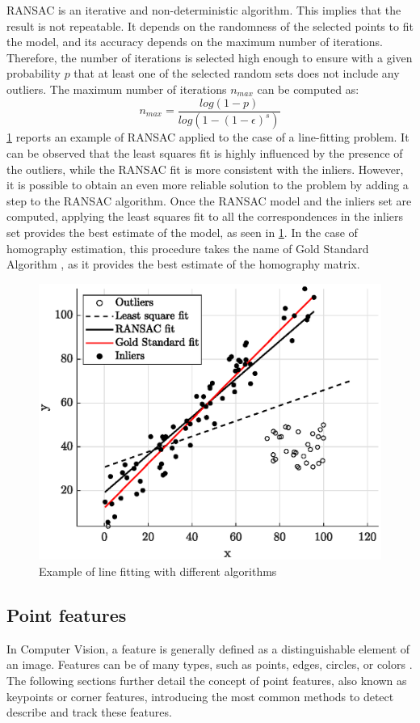 RANSAC is an iterative and non-deterministic algorithm. This implies that the result is not repeatable. It depends on the randomness of the selected points to fit the model, and its accuracy depends on the maximum number of iterations. Therefore, the number of iterations is selected high enough to ensure with a given probability $p$ that at least one of the selected random sets does not include any outliers. The maximum number of iterations $n_{max}$ can be computed as:
\begin{equation}
    n_{max} = \frac{log(1-p)}{log(1-(1-\epsilon)^s)}
\end{equation}
\cref{fig:ransac} reports an example of RANSAC applied to the case of a line-fitting problem. It can be observed that the least squares fit is highly influenced by the presence of the outliers, while the RANSAC fit is more consistent with the inliers.
However, it is possible to obtain an even more reliable solution to the problem by adding a step to the RANSAC algorithm. Once the RANSAC model and the inliers set are computed, applying the least squares fit to all the correspondences in the inliers set provides the best estimate of the model, as seen in \cref{fig:ransac}. In the case of homography estimation, this procedure takes the name of Gold Standard Algorithm \cite{hartley2003multiple}, as it provides the best estimate of the homography matrix. 

\begin{figure}[!ht]
    \centering
    \includegraphics[clip,trim= 0cm 0.5cm 0cm 0cm,width = 0.7\linewidth]{Images/ransac.eps}
    \caption{Example of line fitting with different algorithms}
    \label{fig:ransac}
\end{figure}


\subsection{Point features}
\label{sec:features}
In Computer Vision, a feature is generally defined as a distinguishable element of an image. Features can be of many types, such as points, edges, circles, or colors \cite{rondao2020benchmarking}. The following sections further detail the concept of point features, also known as keypoints or corner features, introducing the most common methods to detect describe and track these features. 

